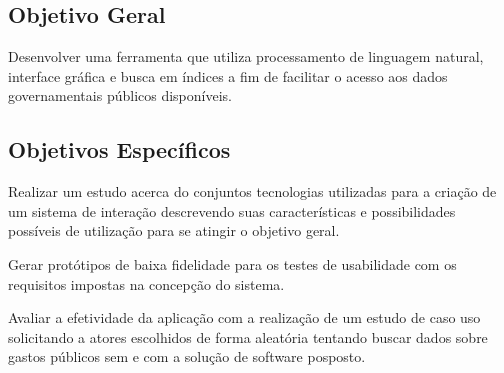 \subsection{Objetivo Geral}
Desenvolver uma ferramenta que utiliza processamento de linguagem natural, interface gráfica e busca em índices a fim de facilitar o acesso aos dados governamentais públicos disponíveis.

\subsection{Objetivos Específicos}
Realizar um estudo acerca do conjuntos tecnologias utilizadas para a criação de um sistema de interação descrevendo suas características e possibilidades possíveis de utilização para se atingir o objetivo geral.

Gerar protótipos de baixa fidelidade para os testes de usabilidade com os requisitos impostas na concepção do sistema.

Avaliar a efetividade da aplicação com a realização de um estudo de caso uso solicitando a atores escolhidos de forma aleatória tentando buscar dados sobre gastos públicos sem e com a solução de software posposto.
